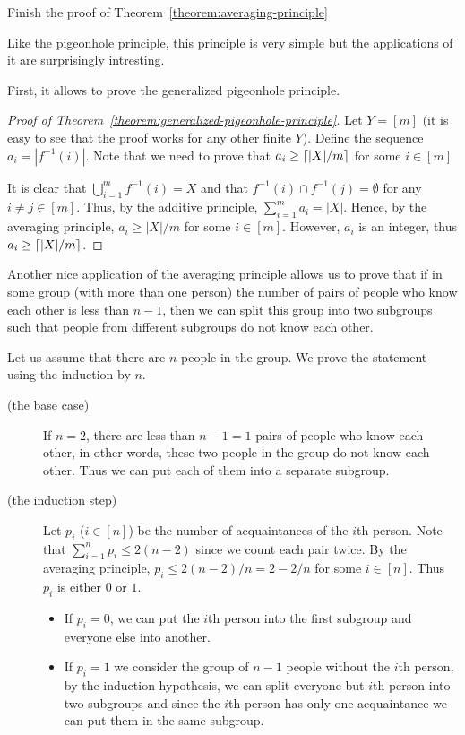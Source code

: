 \begin{exercise}
  Finish the proof of Theorem~\ref{theorem:averaging-principle}
\end{exercise}

Like the pigeonhole principle, this principle is very simple but the
applications of it are surprisingly intresting.

First, it allows to prove the generalized pigeonhole principle.
\begin{proof}[Proof of Theorem~\ref{theorem:generalized-pigeonhole-principle}]
  Let $Y = [m]$ (it is easy to see that the proof works for any other finite
  $Y$). Define the sequence $a_i = |f^{-1}(i)|$.
  Note that we need to prove that $a_i \ge \left\lceil {|X| / m} \right\rceil$ for some
  $i \in [m]$

  It is clear that $\bigcup_{i = 1}^m f^{-1}(i) = X$ and that $f^{-1}(i) \cap
  f^{-1}(j) = \emptyset$ for any $i \neq j \in [m]$. Thus, by the additive
  principle, $\sum_{i = 1}^m a_i = |X|$. Hence, by the averaging principle,
  $a_i \ge |X| / m$ for some $i \in [m]$. However, $a_i$ is an integer, thus
  $a_i \ge \left\lceil {|X| / m} \right\rceil$.
\end{proof}

Another nice application of the averaging principle allows us to prove that if
in some group (with more than one person) the number of pairs of people who
know each other is less than $n - 1$, then we can split this group into two
subgroups such that people from different subgroups do not know each other.

Let us assume that there are $n$ people in the group. We prove the statement
using the induction by $n$.
\begin{description}
  \item [(the base case)] If $n = 2$, there are less than $n - 1 = 1$ pairs
    of people who know each other, in other words, these two people in the
    group do not know each other. Thus we can put each of them into a separate
    subgroup.
  \item [(the induction step)] Let $p_i$ ($i \in [n]$) be the number of
    acquaintances of the $i$th person. Note that
    $\sum_{i = 1}^n p_i \le 2(n - 2)$ since we count each pair twice.
    By the averaging principle, $p_i \le 2(n - 2) / n = 2 - 2 / n$ for some
    $i \in [n]$.  Thus $p_i$ is either $0$ or $1$.
    \begin{itemize}
      \item If $p_i = 0$, we can put the $i$th person into the first subgroup
        and everyone else into another.
      \item If $p_i = 1$ we consider the group of $n - 1$ people without the
        $i$th person, by the induction hypothesis, we can split everyone but
        $i$th person into two subgroups and since the $i$th person has only one
        acquaintance we can put them in the same subgroup.
      \end{itemize}
\end{description}



